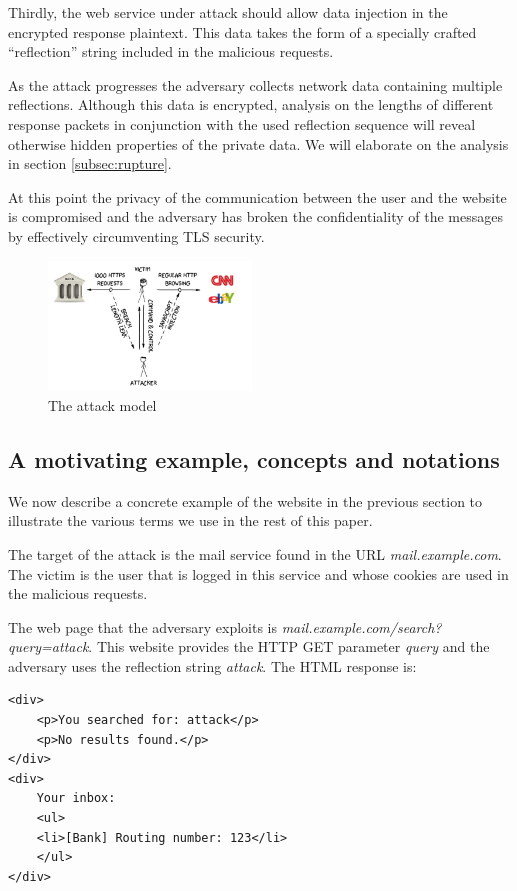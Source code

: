 Thirdly, the web service under attack should allow data injection in the
encrypted response plaintext. This data takes the form of a specially crafted
``reflection'' string included in the malicious requests.

As the attack progresses the adversary collects network data containing multiple
reflections. Although this data is encrypted, analysis on the lengths of
different response packets in conjunction with the used reflection sequence will
reveal otherwise hidden properties of the private data. We will elaborate on the
analysis in section \ref{subsec:rupture}.

At this point the privacy of the communication between the user and the website
is compromised and the adversary has broken the confidentiality of the messages
by effectively circumventing TLS security.

    \begin{figure}[thpb]
        \centering
            \includegraphics[width=0.48\textwidth]{figures/attack_model.png}
        \caption{The attack model}
        \label{fig:attack_model}
    \end{figure}

\subsection{A motivating example, concepts and notations}\label{subsec:terms}
We now describe a concrete example of the website in the previous section to
illustrate the various terms we use in the rest of this paper.

The target of the attack is the mail service found in the URL
\textit{mail.example.com}. The victim is the user that is logged in this service
and whose cookies are used in the malicious requests.

The web page that the adversary exploits is
\textit{mail.example.com/search?query=attack}. This website provides the HTTP
GET parameter \textit{query} and the adversary uses the reflection string
\textit{attack}. The HTML response is:

\begin{lstlisting}[basicstyle=\small\ttfamily]
<div>
    <p>You searched for: attack</p>
    <p>No results found.</p>
</div>
<div>
    Your inbox:
    <ul>
    <li>[Bank] Routing number: 123</li>
    </ul>
</div>
\end{lstlisting}

